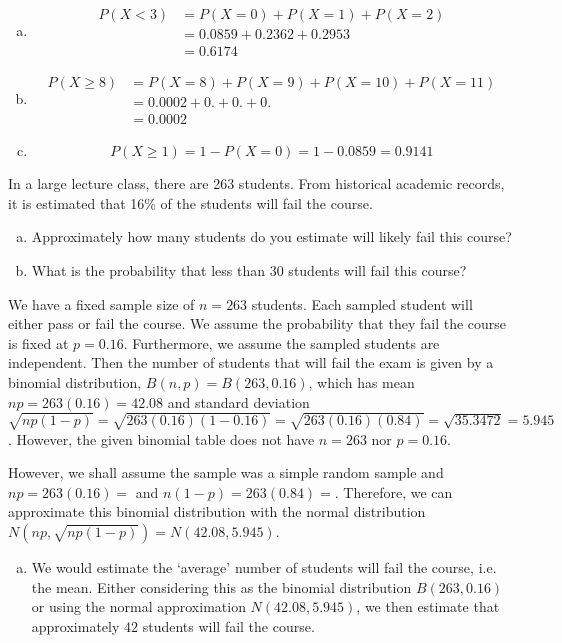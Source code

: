 \documentclass[12pt,letterpaper]{exam}
\begin{document}
\begin{questions}
\begin{enumerate}[(a)]
\item 
	\[
	\begin{aligned}
	P(X < 3)&= P(X= 0) + P(X= 1) + P(X= 2) \\[0.3cm]
	&= 0.0859 + 0.2362 + 0.2953 \\[0.3cm]
	&= 0.6174
	\end{aligned}
	\] \pspace

\item 
	\[
	\begin{aligned}
	P(X \geq 8)&= P(X= 8) + P(X= 9) + P(X= 10) + P(X= 11) \\[0.3cm]
	&= 0.0002 + 0. + 0. + 0. \\[0.3cm]
	&= 0.0002
	\end{aligned}
	\] \pspace

\item 
	\[
	P(X \geq 1)= 1 - P(X= 0)= 1 - 0.0859= 0.9141
	\]
\end{enumerate}



\newpage
\question[10] In a large lecture class, there are 263 students. From historical academic records, it is estimated that 16\% of the students will fail the course. 
	\begin{enumerate}[(a)]
	\item Approximately how many students do you estimate will likely fail this course?
	\item What is the probability that less than 30 students will fail this course?
	\end{enumerate} \pspace

\sol We have a fixed sample size of $n= 263$ students. Each sampled student will either pass or fail the course. We assume the probability that they fail the course is fixed at $p= 0.16$. Furthermore, we assume the sampled students are independent. Then the number of students that will fail the exam is given by a binomial distribution, $B(n, p)= B(263, 0.16)$, which has mean $np= 263(0.16)= 42.08$ and standard deviation $\sqrt{np(1 - p)}= \sqrt{263(0.16)(1 - 0.16)}= \sqrt{263(0.16)(0.84)}= \sqrt{35.3472}= 5.945$. However, the given binomial table does not have $n= 263$ nor $p= 0.16$. \pspace

However, we shall assume the sample was a simple random sample and $np= 263(0.16)= $ and $n(1 - p)= 263(0.84)= $. Therefore, we can approximate this binomial distribution with the normal distribution $N(np, \sqrt{np(1 - p)})= N(42.08, 5.945)$.

\begin{enumerate}[(a)]
\item We would estimate the `average' number of students will fail the course, i.e. the mean. Either considering this as the binomial distribution $B(263, 0.16)$ or using the normal approximation $N(42.08, 5.945)$, we then estimate that approximately $42$ students will fail the course. \pspace


\end{enumerate}
\end{questions}
\end{document}
